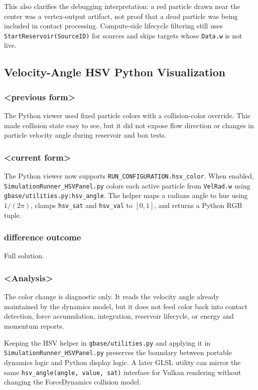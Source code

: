 This also clarifies the debugging interpretation: a red particle drawn near
the center was a vertex-output artifact, not proof that a dead particle was
being included in contact processing.  Compute-side lifecycle filtering still
uses \texttt{StartReservoir(SourceID)} for sources and skips targets whose
\texttt{Data.w} is not live.

\subsection{Velocity-Angle HSV Python Visualization}

\subsubsection{<previous form>}

The Python viewer used fixed particle colors with a collision-color override.
This made collision state easy to see, but it did not expose flow direction or
changes in particle velocity angle during reservoir and box tests.

\subsubsection{<current form>}

The Python viewer now supports \texttt{RUN\_CONFIGURATION.hsv\_color}.  When
enabled, \texttt{SimulationRunner\_HSVPanel.py} colors each active particle from
\texttt{VelRad.w} using \texttt{gbase/utilities.py:hsv\_angle}.  The helper
maps a radians angle to hue using \(1/(2\pi)\), clamps
\texttt{hsv\_sat} and \texttt{hsv\_val} to \([0,1]\), and returns a Python RGB
tuple.

\subsubsection{difference outcome}

Full solution.

\subsubsection{<Analysis>}

The color change is diagnostic only.  It reads the velocity angle already
maintained by the dynamics model, but it does not feed color back into contact
detection, force accumulation, integration, reservoir lifecycle, or energy and
momentum reports.

Keeping the HSV helper in \texttt{gbase/utilities.py} and applying it in
\texttt{SimulationRunner\_HSVPanel.py} preserves the boundary between portable dynamics
logic and Python display logic.  A later GLSL utility can mirror the same
\texttt{hsv\_angle(angle, value, sat)} interface for Vulkan rendering without
changing the ForceDynamics collision model.

